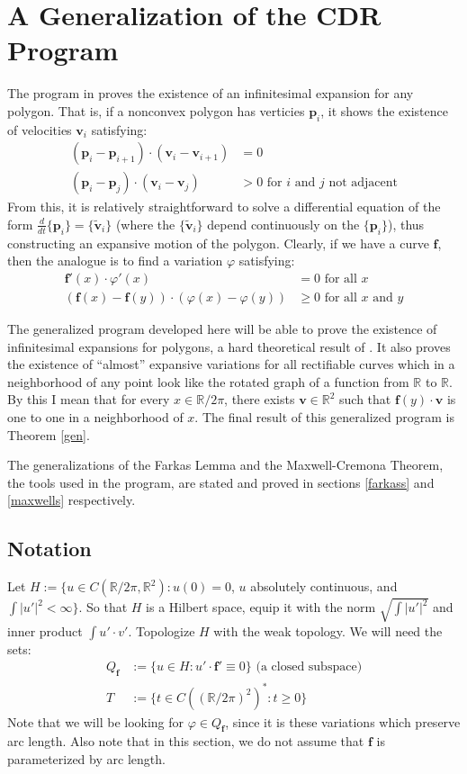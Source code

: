 \documentclass{amsart}
\newcommand{\R}			{\mathbb R}
\newcommand{\f}			{\mathbf f}
\newcommand{\p}			{\mathbf p}
\newcommand{\vv}		{\mathbf v}
\numberwithin{equation}{section}
\begin{document}
\section{A Generalization of the CDR Program}

The program in \cite{cdr} proves the existence of an infinitesimal 
expansion for any polygon.  That is, if a nonconvex polygon has 
verticies $\p_i$, it shows the existence of velocities $\vv_i$ satisfying:
\begin{align}
(\p_i-\p_{i+1})\cdot(\vv_i-\vv_{i+1})&=0\\
(\p_i-\p_j)\cdot(\vv_i-\vv_j)&>0\text{ for $i$ and $j$ not adjacent}
\end{align}
From this, it is relatively straightforward to solve a 
differential equation of the form $\frac d{dt}\{\p_i\}=\{\tilde{\vv}_i\}$ 
(where the $\{\tilde{\vv}_i\}$ depend continuously on the $\{\p_i\}$), 
thus constructing an expansive motion of the polygon.  Clearly, 
if we have a curve $\f$, then the analogue is to find a variation 
$\varphi$ satisfying:
\begin{align}
\f'(x)\cdot\varphi'(x)&=0\text{ for all $x$}\\
(\f(x)-\f(y))\cdot(\varphi(x)-\varphi(y))&\geq 0\text{ for all $x$ and $y$}
\end{align}

The generalized program developed here will be able to 
prove the existence of infinitesimal expansions for 
polygons, a hard theoretical result of \cite{cdr}.  
It also proves the existence of ``almost'' expansive variations 
for all rectifiable curves which in a neighborhood of any point 
look like the rotated graph of a function from $\R$ to $\R$.  
By this I mean that for every $x\in\R/2\pi$, there exists 
$\vv\in\R^2$ such that $\f(y)\cdot\vv$ is one to one in a 
neighborhood of $x$.  The final result of this generalized 
program is Theorem \ref{gen}.

The generalizations of the Farkas Lemma and the Maxwell-Cremona 
Theorem, the tools used in the program, are stated and proved 
in sections \ref{farkass} and \ref{maxwells} respectively.

\subsection{Notation}

Let $H:=\{u\in C(\R/2\pi,\R^2):u(0)=0$, $u$ absolutely 
continuous, and $\int|u'|^2<\infty\}$.  So that $H$ is a Hilbert 
space, equip it with the norm $\sqrt{\int|u'|^2}$ 
and inner product $\int u'\cdot v'$.  Topologize $H$ with 
the weak topology.  We will need the sets:
\begin{align}
Q_\f&:=\{u\in H:u'\cdot\f'\equiv 0\}\text{ (a closed subspace)}\\
T&:=\{t\in C((\R/2\pi)^2)^*:t\geq 0\}
\end{align}
Note that we will be looking for $\varphi\in Q_\f$, since it is 
these variations which preserve arc length.  Also note that in 
this section, we do not assume that $\f$ is parameterized by 
arc length.
\end{document}

